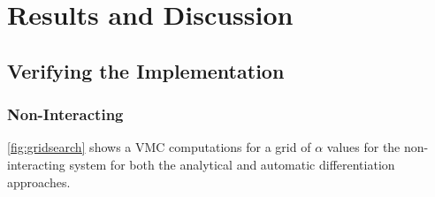 \section{Results and Discussion}\label{sec:Results}

\subsection{Verifying the Implementation}\label{sec:project results}

\subsubsection{Non-Interacting}

\autoref{fig:gridsearch} shows a VMC computations for a grid of $\alpha$ values for the non-interacting system for both the analytical and automatic differentiation approaches. 

